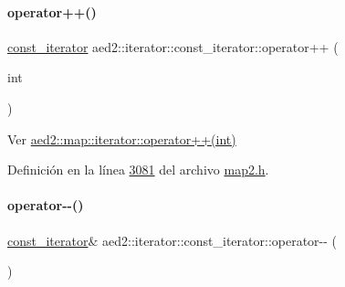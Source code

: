 \mbox{\label{classaed2_1_1iterator_1_1const__iterator_a27088afe8fffc9d7fdc2f1596b401d46_a27088afe8fffc9d7fdc2f1596b401d46}} 
\paragraph{\texorpdfstring{operator++()}{operator++()}\hspace{0.1cm}{\footnotesize\ttfamily [2/2]}}
{\footnotesize\ttfamily \hyperlink{classaed2_1_1iterator_1_1const__iterator}{const\+\_\+iterator} aed2\+::iterator\+::const\+\_\+iterator\+::operator++ (\begin{DoxyParamCaption}\item[{int}]{ }\end{DoxyParamCaption})\hspace{0.3cm}{\ttfamily [inline]}}



Ver \hyperlink{classaed2_1_1map_1_1iterator_af4fe5565eb478cfccd254b2ef230b974_af4fe5565eb478cfccd254b2ef230b974}{aed2\+::map\+::iterator\+::operator++(int)} 



Definición en la línea \hyperlink{map2_8h_source_l03081}{3081} del archivo \hyperlink{map2_8h_source}{map2.\+h}.

\mbox{\label{classaed2_1_1iterator_1_1const__iterator_a1aac8371db66fcc4035863537b554b99_a1aac8371db66fcc4035863537b554b99}} 
\paragraph{\texorpdfstring{operator-\/-\/()}{operator--()}\hspace{0.1cm}{\footnotesize\ttfamily [1/2]}}
{\footnotesize\ttfamily \hyperlink{classaed2_1_1iterator_1_1const__iterator}{const\+\_\+iterator}\& aed2\+::iterator\+::const\+\_\+iterator\+::operator-\/-\/ (\begin{DoxyParamCaption}{ }\end{DoxyParamCaption})\hspace{0.3cm}{\ttfamily [inline]}}



